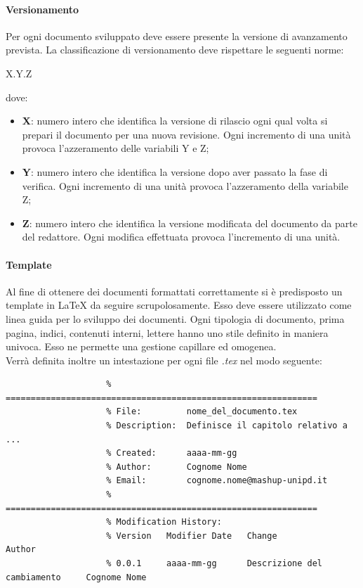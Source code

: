 			\paragraph{Versionamento}
			Per ogni documento sviluppato deve essere presente la versione di avanzamento prevista. La classificazione di versionamento deve rispettare le seguenti norme:
			\begin{center}
				X.Y.Z
			\end{center}
			dove:
			\begin{itemize}
				\item \textbf{X}: numero intero che identifica la versione di rilascio ogni qual volta si prepari il documento per una nuova revisione. Ogni incremento di una unità provoca l'azzeramento delle variabili Y e Z;
				\item \textbf{Y}: numero intero che identifica la versione dopo aver passato la fase di verifica. Ogni incremento di una unità provoca l'azzeramento della variabile Z;
				\item \textbf{Z}: numero intero che identifica la versione modificata del documento da parte del redattore. Ogni modifica effettuata provoca l'incremento di una unità.
			\end{itemize}


			\paragraph{Template}
			Al fine di ottenere dei documenti formattati correttamente si è predisposto un template in \LaTeX{} da seguire scrupolosamente. Esso deve essere utilizzato come linea guida per lo sviluppo dei documenti. Ogni tipologia di documento, prima pagina, indici, contenuti interni, lettere hanno uno stile definito in maniera univoca. Esso ne permette una gestione capillare ed omogenea.\\
			Verrà definita inoltre un intestazione per ogni file \emph{.tex} nel modo seguente:
				\begin{verbatim}
					% ==============================================================
					% File:			nome_del_documento.tex
					% Description:	Definisce il capitolo relativo a ...
					% Created:		aaaa-mm-gg
					% Author:		Cognome Nome
					% Email:		cognome.nome@mashup-unipd.it
					% ==============================================================
					% Modification History:
					% Version	Modifier Date	Change							Author
					% 0.0.1 	aaaa-mm-gg 		Descrizione del cambiamento		Cognome Nome

				\end{verbatim}
			\noindent

